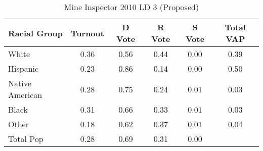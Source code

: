 \begin{table}[htb]
\begin{center}
\caption{Mine Inspector 2010 LD 3 (Proposed)}
\label{smine_vap_ld_3}
\begin{tabular}{lccccc}
  \hline
Racial Group & Turnout & D Vote & R Vote & S Vote & Total VAP \\ 
  \hline
White & 0.36 & 0.56 & 0.44 & 0.00 & 0.39 \\ 
  Hispanic & 0.23 & 0.86 & 0.14 & 0.00 & 0.50 \\ 
  Native American & 0.28 & 0.75 & 0.24 & 0.01 & 0.03 \\ 
  Black & 0.31 & 0.66 & 0.33 & 0.01 & 0.03 \\ 
  Other & 0.18 & 0.62 & 0.37 & 0.01 & 0.04 \\ 
  Total Pop & 0.28 & 0.69 & 0.31 & 0.00 &  \\ 
   \hline
\end{tabular}
\end{center}
\end{table}
